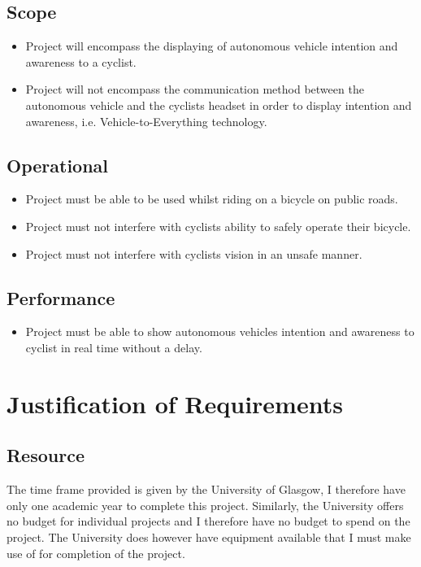 \documentclass{l4proj}
\begin{document}
\subsection{Scope}

\begin{itemize}
    \item Project will encompass the displaying of autonomous vehicle intention and awareness to a cyclist.
    \item Project will not encompass the communication method between the autonomous vehicle and the cyclists headset in order to display intention and awareness, i.e. Vehicle-to-Everything technology.
\end{itemize}

\subsection{Operational}

\begin{itemize}
    \item Project must be able to be used whilst riding on a bicycle on public roads.
    \item Project must not interfere with cyclists ability to safely operate their bicycle.
    \item Project must not interfere with cyclists vision in an unsafe manner.
\end{itemize}

\subsection{Performance}

\begin{itemize}
    \item Project must be able to show autonomous vehicles intention and awareness to cyclist in real time without a delay.
\end{itemize}

\section{Justification of Requirements}

\subsection{Resource}

The time frame provided is given by the University of Glasgow, I therefore have only one academic year to complete this project. Similarly, the University offers no budget for individual projects and I therefore have no budget to spend on the project. The University does however have equipment available that I must make use of for completion of the project.
\end{document}
